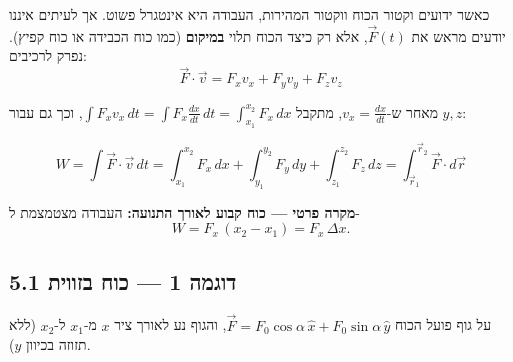 \documentclass[12pt, a4paper]{article}
\newcommand{\hvec}[1]{\overrightarrow{#1}}
\begin{document}
כאשר ידועים וקטור הכוח ווקטור המהירות, העבודה היא אינטגרל פשוט. אך לעיתים איננו יודעים מראש את \textenglish{$\hvec{F}(t)$}, אלא רק כיצד הכוח תלוי \textbf{במיקום} (כמו כוח הכבידה או כוח קפיץ). נפרק לרכיבים:
\[
  \hvec{F}\cdot\hvec{v} = F_x v_x + F_y v_y + F_z v_z
\]

מאחר ש-\textenglish{$v_x = \tfrac{dx}{dt}$}, מתקבל \textenglish{$\int F_x v_x\,dt = \int F_x \tfrac{dx}{dt}\,dt = \int_{x_1}^{x_2} F_x\,dx$}, וכך גם עבור \textenglish{$y, z$}:

\begin{tcolorbox}[resultbox]
\[
  W = \int \hvec{F}\cdot\hvec{v}\,dt
    = \int_{x_1}^{x_2} F_x\,dx + \int_{y_1}^{y_2} F_y\,dy + \int_{z_1}^{z_2} F_z\,dz
    = \int_{\hvec{r}_1}^{\hvec{r}_2} \hvec{F}\cdot d\hvec{r}
\]
\end{tcolorbox}

\textbf{מקרה פרטי --- כוח קבוע לאורך התנועה:} העבודה מצטמצמת ל-
\[
  W = F_x\,(x_2 - x_1) = F_x\,\Delta x.
\]

\subsection*{5.1 דוגמה 1 --- כוח בזווית}

על גוף פועל הכוח \textenglish{$\hvec{F} = F_0\cos\alpha\,\hat{x} + F_0\sin\alpha\,\hat{y}$}, והגוף נע לאורך ציר \textenglish{$x$} מ-\textenglish{$x_1$} ל-\textenglish{$x_2$} (ללא תזוזה בכיוון \textenglish{$y$}).

\begin{center}
\end{center}
\end{document}
